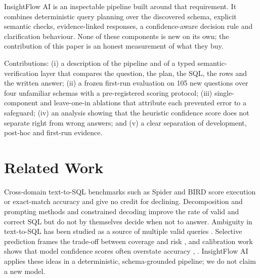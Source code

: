 \documentclass[conference]{IEEEtran}
\begin{document}
InsightFlow AI is an inspectable pipeline built around that requirement. It combines deterministic query planning over the discovered schema, explicit semantic checks, evidence-linked responses, a confidence-aware decision rule and clarification behaviour. None of these components is new on its own; the contribution of this paper is an honest measurement of what they buy.

Contributions: (i) a description of the pipeline and of a typed semantic-verification layer that compares the question, the plan, the SQL, the rows and the written answer; (ii) a frozen first-run evaluation on 105 new questions over four unfamiliar schemas with a pre-registered scoring protocol; (iii) single-component and leave-one-in ablations that attribute each prevented error to a safeguard; (iv) an analysis showing that the heuristic confidence score does not separate right from wrong answers; and (v) a clear separation of development, post-hoc and first-run evidence.

\section{Related Work}
Cross-domain text-to-SQL benchmarks such as Spider \cite{r1} and BIRD \cite{r2} score execution or exact-match accuracy and give no credit for declining. Decomposition and prompting methods \cite{r3} and constrained decoding \cite{r4} improve the rate of valid and correct SQL but do not by themselves decide when not to answer. Ambiguity in text-to-SQL has been studied as a source of multiple valid queries \cite{r5}. Selective prediction frames the trade-off between coverage and risk \cite{r6}, and calibration work shows that model confidence scores often overstate accuracy \cite{r7}, \cite{r8}. InsightFlow AI applies these ideas in a deterministic, schema-grounded pipeline; we do not claim a new model.
\end{document}
